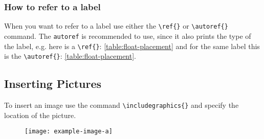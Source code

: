 \subsubsection*{How to refer to a label}

When you want to refer to a label use either the \texttt{\textbackslash ref\{\}}
or \texttt{\textbackslash autoref\{\}} command.
The \texttt{autoref} is recommended to use, since it also prints the type of the
label, e.g. here is a \texttt{\textbackslash ref\{\}}: \ref{table:float-placement} and
for the same label this is the \texttt{\textbackslash autoref\{\}}:
\autoref{table:float-placement}.



\subsection{Inserting Pictures}

To insert an image use the command \texttt{\textbackslash includegraphics\{\}}
and specify the location of the picture.

\begin{figure}[h]
    \centering
    \texttt{[image: example-image-a]}
\end{figure}

